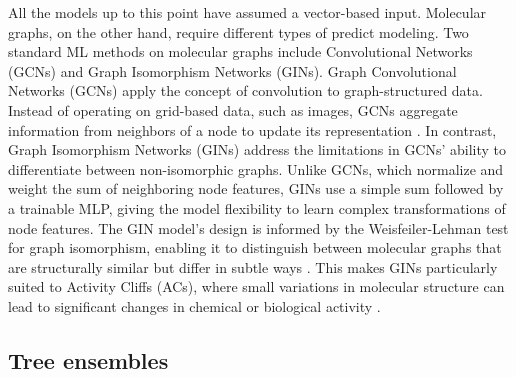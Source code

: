 All the models up to this point have assumed a vector-based input. Molecular graphs, on the other hand, require different types of predict modeling. Two standard ML methods on molecular graphs include Convolutional Networks (GCNs) and Graph Isomorphism Networks (GINs). Graph Convolutional Networks (GCNs) apply the concept of convolution to graph-structured data. Instead of operating on grid-based data, such as images, GCNs aggregate information from neighbors of a node to update its representation \citep{TeachOpenCADD2023, Xu2019}. In contrast, Graph Isomorphism Networks (GINs) address the limitations in GCNs’ ability to differentiate between non-isomorphic graphs. Unlike GCNs, which normalize and weight the sum of neighboring node features, GINs use a simple sum followed by a trainable MLP, giving the model flexibility to learn complex transformations of node features. The GIN model’s design is informed by the Weisfeiler-Lehman test for graph isomorphism, enabling it to distinguish between molecular graphs that are structurally similar but differ in subtle ways \citep{TeachOpenCADD2023, Xu2019}. This makes GINs particularly suited to Activity Cliffs (ACs), where small variations in molecular structure can lead to significant changes in chemical or biological activity \citep{TeachOpenCADD2023}. 


\subsection{Tree ensembles}


